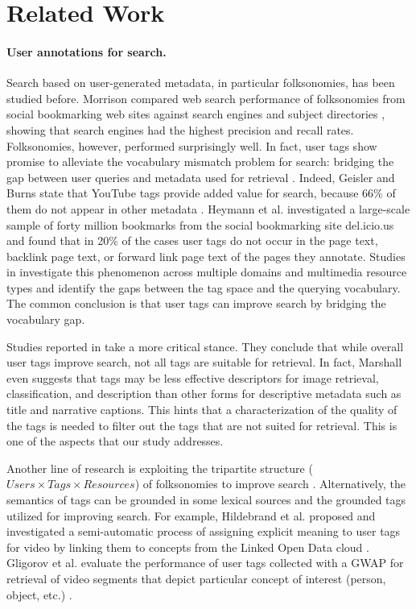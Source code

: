 \section{Related Work}\label{sec:topicir-filter:relatedwork}
\paragraph{User annotations for search.} Search based on user-generated metadata, in particular folksonomies, has been studied before. Morrison compared web search performance of folksonomies from social bookmarking web sites against search engines and subject directories \cite{morison}, showing that search engines had the highest precision and recall rates. Folksonomies, however, performed surprisingly well. In fact, user tags show promise to alleviate the vocabulary mismatch problem for search: bridging the gap between user queries and metadata used for retrieval \cite{vocprob}. Indeed, Geisler and Burns state that YouTube tags provide added value for search, because 66\% of them do not appear in  other metadata \cite{youtube}. Heymann et al. investigated a large-scale sample of forty million bookmarks from the social bookmarking site del.icio.us and found that in 20\% of the cases user tags do not occur in the page text, backlink page text, or forward link page text of the pages they annotate. Studies in \cite{Bischoff:2010:BGT:1833903.1834001,Halvey:2007:AOV:1286240.1286301,journals/jasis/Rorissa10,Yanbe:2007:SBE:1255175.1255198} investigate this phenomenon across multiple domains and multimedia resource types and identify the gaps between the tag space and the querying vocabulary. The common conclusion is that user tags can improve search by bridging the vocabulary gap. 

Studies reported in \cite{Bischoff:2008:TUS:1458082.1458112,Sun:2010:QTR:1873951.1874029,Marshall:2009:NBN:1555400.1555438} take a more critical stance. They conclude that while overall user tags improve search, not all tags are suitable for retrieval. In fact, Marshall \cite{Marshall:2009:NBN:1555400.1555438} even suggests that tags  may be less effective descriptors for image retrieval, classification, and description than other forms for descriptive metadata such as title and narrative captions. This hints that a characterization of the quality of the tags is needed to filter out the tags that are not suited for retrieval. This is one of the aspects that our study addresses. 

Another line of research is exploiting the tripartite structure ($Users \times Tags \times Resources$) of folksonomies to improve search \cite{Hotho:2006:IRF:2094613.2094652,Bao:2007:OWS:1242572.1242640}. Alternatively, the semantics of tags can be grounded in some lexical sources and the grounded tags utilized for improving search. For example, Hildebrand et al. proposed and investigated a semi-automatic process of assigning explicit meaning to user tags for video by linking them to concepts from the Linked Open Data cloud \cite{michiel}. Gligorov et al. evaluate the performance of user tags collected with a GWAP for retrieval of video segments that depict particular concept of interest (person, object, etc.) \cite{ecir}.

